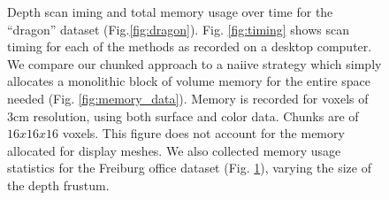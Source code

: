 \documentclass[conference,10pt]{IEEEtran}
\begin{document}
\begin{figure}
\begin{subfigure}{1.0\columnwidth}
		 \caption{} 
		 \label{fig:memory_data2}
	 \end{subfigure} 
      \caption{Depth scan iming and total memory usage over time for the
      ``dragon'' dataset (Fig.\ref{fig:dragon}). Fig. \ref{fig:timing} shows
      scan timing for
each of the methods as recorded on a desktop computer. We compare our chunked
      approach to a naiive strategy which simply allocates a monolithic block of
      volume memory for the entire space needed (Fig. \ref{fig:memory_data}).
      Memory is recorded for voxels of 3cm resolution, using both surface and
      color data. Chunks are of $16x16x16$ voxels. This figure does not account
      for the memory allocated for display meshes. We also collected memory
      usage statistics for the Freiburg \cite{FREIBURG} office dataset (Fig.
      \ref{fig:memory_data2}), varying the size of the depth frustum.}
  \label{fig:memory}
\end{figure}
\end{document}
